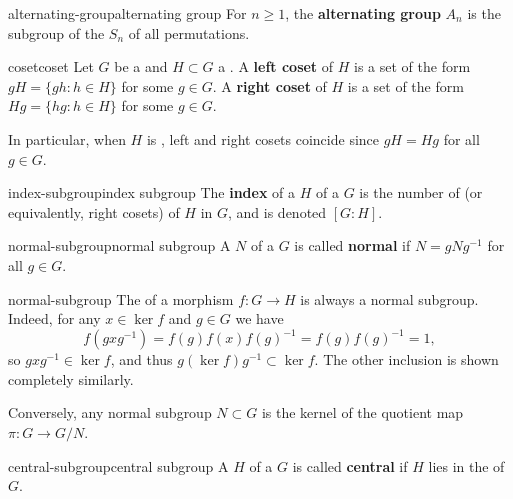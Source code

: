 \begin{topic}{alternating-group}{alternating group}
    For $n \ge 1$, the \textbf{alternating group} $A_n$ is the subgroup of the  $S_n$ of all  permutations.
\end{topic}

\begin{topic}{coset}{coset}
    Let $G$ be a  and $H \subset G$ a . A \textbf{left coset} of $H$ is a set of the form $gH = \{ gh : h \in H \}$ for some $g \in G$. A \textbf{right coset} of $H$ is a set of the form $Hg = \{ hg : h \in H \}$ for some $g \in G$.
    
    In particular, when $H$ is , left and right cosets coincide since $gH = Hg$ for all $g \in G$.
\end{topic}

\begin{topic}{index-subgroup}{index subgroup}
    The \textbf{index} of a  $H$ of a  $G$ is the number of  (or equivalently, right cosets) of $H$ in $G$, and is denoted $[G : H]$.
\end{topic}

\begin{topic}{normal-subgroup}{normal subgroup}
    A  $N$ of a  $G$ is called \textbf{normal} if $N = g N g^{-1}$ for all $g \in G$.
\end{topic}

\begin{example}{normal-subgroup}
    The  of a morphism $f \colon G \to H$ is always a normal subgroup. Indeed, for any $x \in \ker f$ and $g \in G$ we have
    \[ f(gxg^{-1}) = f(g) f(x) f(g)^{-1} = f(g) f(g)^{-1} = 1 , \]
    so $gxg^{-1} \in \ker f$, and thus $g (\ker f) g^{-1} \subset \ker f$. The other inclusion is shown completely similarly.
    
    Conversely, any normal subgroup $N \subset G$ is the kernel of the quotient map $\pi \colon G \to G / N$.
\end{example}

\begin{topic}{central-subgroup}{central subgroup}
    A  $H$ of a  $G$ is called \textbf{central} if $H$ lies in the  of $G$.
\end{topic}

